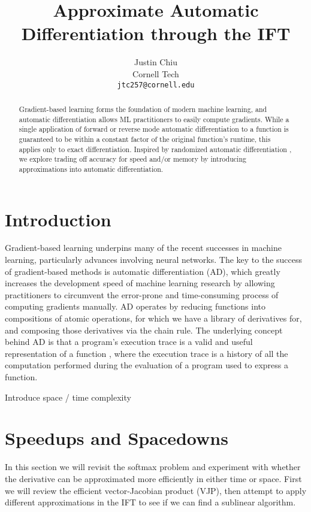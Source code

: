 \documentclass[11pt]{article}
\title{Approximate Automatic Differentiation through the IFT}
\author{Justin Chiu \\
  Cornell Tech \\
  \texttt{jtc257@cornell.edu}}
\begin{document}
\maketitle
\begin{abstract}
Gradient-based learning forms the foundation of modern machine learning,
and automatic differentiation allows ML practitioners to easily compute gradients.
While a single application of forward or reverse mode automatic differentiation
to a function is guaranteed to be within a constant factor of the original
function's runtime, this applies only to exact differentiation.
Inspired by randomized automatic differentiation \citep{rad},
we explore trading off accuracy for speed and/or memory by introducing
approximations into automatic differentiation.
\end{abstract}

\section{Introduction}
\label{sec:intro}
Gradient-based learning underpins many of the recent successes in machine learning,
particularly advances involving neural networks.
The key to the success of gradient-based methods is automatic differentiation (AD),
which greatly increases the development speed of machine learning research by
allowing practitioners to circumvent the error-prone and time-consuming process
of computing gradients manually.
AD operates by reducing functions into compositions of atomic operations,
for which we have a library of derivatives for,
and composing those derivatives via the chain rule.
The underlying concept behind AD is that a program's execution trace is a valid
and useful representation of a function \citep{griewank2008autodiff},
where the execution trace is a history of all the computation performed
during the evaluation of a program used to express a function.

{\color{red} Introduce space / time complexity}

\section{Speedups and Spacedowns}
In this section we will revisit the softmax problem and experiment with
whether the derivative can be approximated more efficiently in either time or space.
First we will review the efficient vector-Jacobian product (VJP),
then attempt to apply different approximations in the IFT to see if we can
find a sublinear algorithm.
\end{document}
